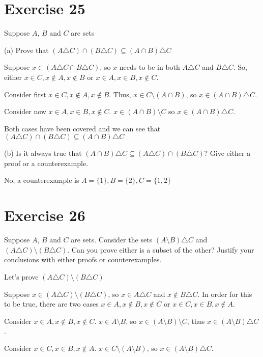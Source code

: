 \documentclass[11pt]{article}
\begin{document}
\section*{Exercise 25} 

Suppose $A$, $B$ and $C$ are sets 

\noindent (a) Prove that 
$(A \triangle C) \cap (B \triangle C) \subseteq (A \cap B) \triangle C$

Suppose $x \in (A \triangle C \cap B \triangle C)$, so $x$ needs to be in both 
$A \triangle C$ and $B \triangle C$. So, either $x \in C, x \notin A, x \notin B$
or $x \in A, x \in B, x \notin C$. 

Consider first $x \in C, x \notin A, x \notin B$. Thus, 
$x \in C \setminus (A \cap B)$, so $x \in (A \cap B) \triangle C$.

Consider now $x \in A, x \in B, x \notin C$. $x \in (A \cap B) \setminus C$ 
so $x \in (A \cap B) \triangle C$. 

Both cases have been covered and we can see that 
$(A \triangle C) \cap (B \triangle C) \subseteq (A \cap B) \triangle C$

\noindent (b) Is it always true that 
$(A \cap B) \triangle C \subseteq (A \triangle C) \cap (B \triangle C)$? Give 
either a proof or a counterexample.

No, a counterexample is $A = \{1\}, B = \{2\}, C = \{1,2\}$

\section*{Exercise 26}

Suppose $A$, $B$ and $C$ are sets. Consider the sets $(A \setminus B) \triangle C$
and $(A \triangle C) \setminus (B \triangle C)$. Can you prove either is a subset 
of the other? Justify your conclusions with either proofs or counterexamples.

Let's prove $(A \triangle C) \setminus (B \triangle C)$

Suppose $x \in (A \triangle C) \setminus (B \triangle C)$, so $x \in A \triangle C$
and $x \notin B \triangle C$. In order for this to be true, there are two cases 
$x \in A, x \notin B, x \notin C$ or $x \in C, x \in B, x \notin A$.

Consider $x \in A, x \notin B, x \notin C$. $x \in A \setminus B$, so 
$x \in (A \setminus B) \setminus C$, thus $x \in (A \setminus B) \triangle C$.

Consider $x \in C, x \in B, x \notin A$. $x \in C \setminus (A \setminus B)$,
so $x \in (A \setminus B) \triangle C$.
\end{document}
